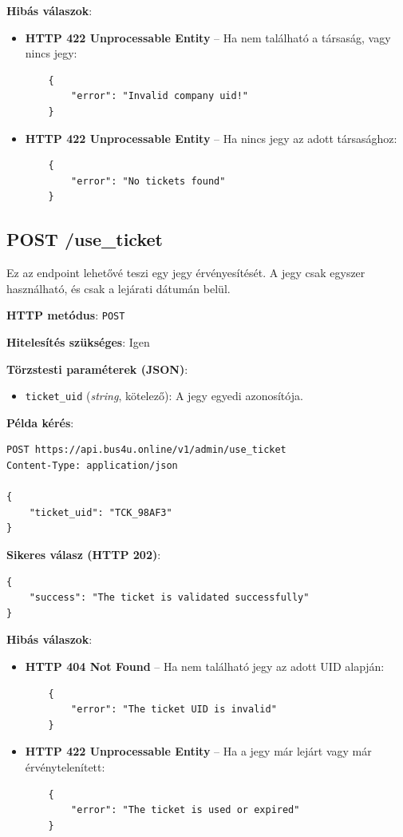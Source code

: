 \textbf{Hibás válaszok}:

\begin{itemize}
    \item \textbf{HTTP 422 Unprocessable Entity} – Ha nem található a társaság, vagy nincs jegy:
    \begin{verbatim}
    {
        "error": "Invalid company uid!"
    }
    \end{verbatim}

    \item \textbf{HTTP 422 Unprocessable Entity} – Ha nincs jegy az adott társasághoz:
    \begin{verbatim}
    {
        "error": "No tickets found"
    }
    \end{verbatim}
\end{itemize}

\subsection{POST /use\_ticket}
Ez az endpoint lehetővé teszi egy jegy érvényesítését. A jegy csak egyszer használható, és csak a lejárati dátumán belül.

\textbf{HTTP metódus}: \verb|POST|

\textbf{Hitelesítés szükséges}: Igen

\textbf{Törzstesti paraméterek (JSON)}:
\begin{itemize}
    \item \texttt{ticket\_uid} (\textit{string}, kötelező): A jegy egyedi azonosítója.
\end{itemize}

\textbf{Példa kérés}:
\begin{verbatim}
POST https://api.bus4u.online/v1/admin/use_ticket
Content-Type: application/json

{
    "ticket_uid": "TCK_98AF3"
}
\end{verbatim}

\textbf{Sikeres válasz (HTTP 202)}:
\begin{verbatim}
{
    "success": "The ticket is validated successfully"
}
\end{verbatim}

\textbf{Hibás válaszok}:
\begin{itemize}
    \item \textbf{HTTP 404 Not Found} – Ha nem található jegy az adott UID alapján:
    \begin{verbatim}
    {
        "error": "The ticket UID is invalid"
    }
    \end{verbatim}

    \item \textbf{HTTP 422 Unprocessable Entity} – Ha a jegy már lejárt vagy már érvénytelenített:
    \begin{verbatim}
    {
        "error": "The ticket is used or expired"
    }
    \end{verbatim}
\end{itemize}

